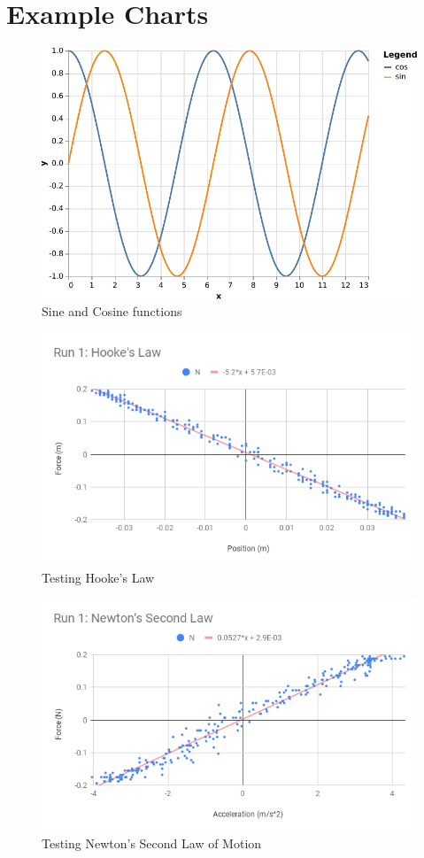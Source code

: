 \section{Example Charts}
%
\begin{figure}[ht]
    \centering
    \includegraphics{chart/11-shm/trig.pdf}
    \caption{Sine and Cosine functions}
    \label{figure:11.sin.cos}
\end{figure}
%
\begin{figure}[ht]
    \centering
    \includegraphics[scale=0.71]{image/11-shm/run-1-hooke.png}
    \caption{Testing Hooke's Law}
    \label{figure.11.hooke}
\end{figure}
%
\begin{figure}[ht]
    \centering
    \includegraphics[scale=0.71]{image/11-shm/run-1-newton.png}
    \caption{Testing Newton's Second Law of Motion}
    \label{figure.11.newton}
\end{figure}
